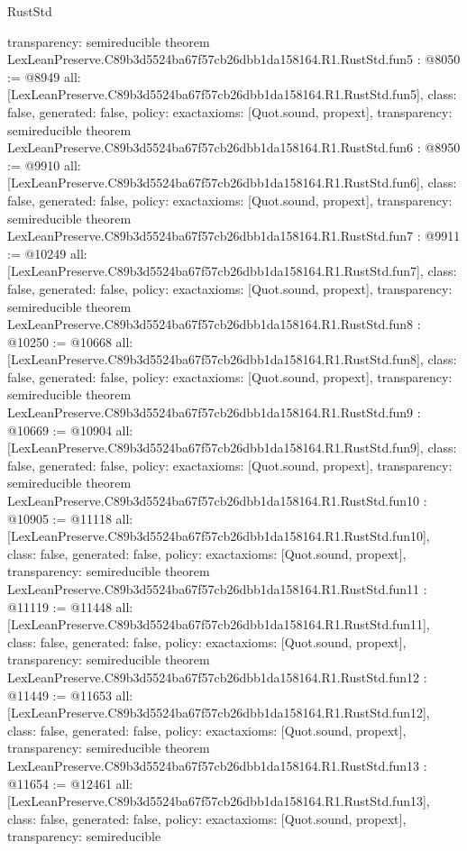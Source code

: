 \begin{lexlean}{RustStd}
\begin{coremodule}
{  transparency: semireducible
}
theorem LexLeanPreserve.C89b3d5524ba67f57cb26dbb1da158164.R1.RustStd.fun5 : @8050 := @8949 {
  all: [LexLeanPreserve.C89b3d5524ba67f57cb26dbb1da158164.R1.RustStd.fun5],
  class: false,
  generated: false,
  policy: exact{axioms: [Quot.sound, propext]},
  transparency: semireducible
}
theorem LexLeanPreserve.C89b3d5524ba67f57cb26dbb1da158164.R1.RustStd.fun6 : @8950 := @9910 {
  all: [LexLeanPreserve.C89b3d5524ba67f57cb26dbb1da158164.R1.RustStd.fun6],
  class: false,
  generated: false,
  policy: exact{axioms: [Quot.sound, propext]},
  transparency: semireducible
}
theorem LexLeanPreserve.C89b3d5524ba67f57cb26dbb1da158164.R1.RustStd.fun7 : @9911 := @10249 {
  all: [LexLeanPreserve.C89b3d5524ba67f57cb26dbb1da158164.R1.RustStd.fun7],
  class: false,
  generated: false,
  policy: exact{axioms: [Quot.sound, propext]},
  transparency: semireducible
}
theorem LexLeanPreserve.C89b3d5524ba67f57cb26dbb1da158164.R1.RustStd.fun8 : @10250 := @10668 {
  all: [LexLeanPreserve.C89b3d5524ba67f57cb26dbb1da158164.R1.RustStd.fun8],
  class: false,
  generated: false,
  policy: exact{axioms: [Quot.sound, propext]},
  transparency: semireducible
}
theorem LexLeanPreserve.C89b3d5524ba67f57cb26dbb1da158164.R1.RustStd.fun9 : @10669 := @10904 {
  all: [LexLeanPreserve.C89b3d5524ba67f57cb26dbb1da158164.R1.RustStd.fun9],
  class: false,
  generated: false,
  policy: exact{axioms: [Quot.sound, propext]},
  transparency: semireducible
}
theorem LexLeanPreserve.C89b3d5524ba67f57cb26dbb1da158164.R1.RustStd.fun10 : @10905 := @11118 {
  all: [LexLeanPreserve.C89b3d5524ba67f57cb26dbb1da158164.R1.RustStd.fun10],
  class: false,
  generated: false,
  policy: exact{axioms: [Quot.sound, propext]},
  transparency: semireducible
}
theorem LexLeanPreserve.C89b3d5524ba67f57cb26dbb1da158164.R1.RustStd.fun11 : @11119 := @11448 {
  all: [LexLeanPreserve.C89b3d5524ba67f57cb26dbb1da158164.R1.RustStd.fun11],
  class: false,
  generated: false,
  policy: exact{axioms: [Quot.sound, propext]},
  transparency: semireducible
}
theorem LexLeanPreserve.C89b3d5524ba67f57cb26dbb1da158164.R1.RustStd.fun12 : @11449 := @11653 {
  all: [LexLeanPreserve.C89b3d5524ba67f57cb26dbb1da158164.R1.RustStd.fun12],
  class: false,
  generated: false,
  policy: exact{axioms: [Quot.sound, propext]},
  transparency: semireducible
}
theorem LexLeanPreserve.C89b3d5524ba67f57cb26dbb1da158164.R1.RustStd.fun13 : @11654 := @12461 {
  all: [LexLeanPreserve.C89b3d5524ba67f57cb26dbb1da158164.R1.RustStd.fun13],
  class: false,
  generated: false,
  policy: exact{axioms: [Quot.sound, propext]},
  transparency: semireducible
}
\end{coremodule}
\end{lexlean}
